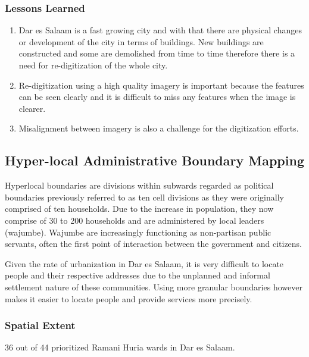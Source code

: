 \documentclass[a4paper,12pt,twoside]{article}
\begin{document}
\subsubsection{Lessons Learned}
\begin{enumerate}
	\item Dar es Salaam is a fast growing city and with that there are physical changes or development of the city in terms of buildings. New buildings are constructed and some are demolished from time to time therefore there is a need for re-digitization of the whole city.
	\item Re-digitization using a high quality imagery is important because the features can be seen clearly and it is difficult to miss any features when the image is clearer.
	\item Misalignment between imagery is also a challenge for the digitization efforts.
\end{enumerate}

\newpage
\subsection{Hyper-local Administrative Boundary Mapping}
Hyperlocal boundaries are divisions within subwards regarded as political boundaries previously referred to as ten cell divisions as they were originally comprised of ten households.
Due to the increase in population, they now comprise of 30 to 200 households and are administered by local leaders (wajumbe). Wajumbe are increasingly functioning as non-partisan public servants, often the first point of interaction between the government and citizens.

Given the rate of urbanization in Dar es Salaam, it is very difficult to locate people and their respective addresses due to the unplanned and informal settlement nature of these   communities. Using more granular boundaries however makes it easier to locate people and provide services more precisely.  

\subsubsection{Spatial Extent}
36 out of 44 prioritized Ramani Huria wards in Dar es Salaam.
\end{document}
